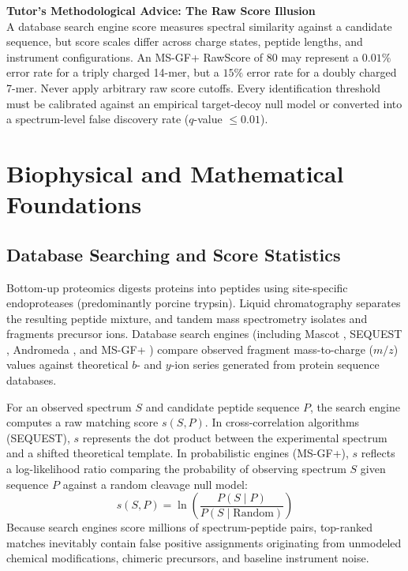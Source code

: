 \documentclass[11pt,twoside,openright]{book}
\begin{document}
\FloatBarrier

\begin{notebox}
\textbf{Tutor's Methodological Advice: The Raw Score Illusion}\\
A database search engine score measures spectral similarity against a candidate sequence, but score scales differ across charge states, peptide lengths, and instrument configurations. An MS-GF+ RawScore of 80 may represent a $0.01\%$ error rate for a triply charged 14-mer, but a $15\%$ error rate for a doubly charged 7-mer. Never apply arbitrary raw score cutoffs. Every identification threshold must be calibrated against an empirical target-decoy null model or converted into a spectrum-level false discovery rate ($q$-value $\le 0.01$).
\end{notebox}

\section{Biophysical and Mathematical Foundations}

\subsection{Database Searching and Score Statistics}
Bottom-up proteomics digests proteins into peptides using site-specific endoproteases (predominantly porcine trypsin). Liquid chromatography separates the resulting peptide mixture, and tandem mass spectrometry isolates and fragments precursor ions. Database search engines (including Mascot \cite{perkins1999probability}, SEQUEST \cite{eng1994approach}, Andromeda \cite{cox2011andromeda}, and MS-GF+ \cite{kim2014ms}) compare observed fragment mass-to-charge ($m/z$) values against theoretical $b$- and $y$-ion series generated from protein sequence databases.

For an observed spectrum $S$ and candidate peptide sequence $P$, the search engine computes a raw matching score $s(S, P)$. In cross-correlation algorithms (SEQUEST), $s$ represents the dot product between the experimental spectrum and a shifted theoretical template. In probabilistic engines (MS-GF+), $s$ reflects a log-likelihood ratio comparing the probability of observing spectrum $S$ given sequence $P$ against a random cleavage null model:
\begin{equation}
s(S, P) = \ln \left( \frac{P(S \mid P)}{P(S \mid \text{Random})} \right)
\label{eq:msgf_score}
\end{equation}
Because search engines score millions of spectrum-peptide pairs, top-ranked matches inevitably contain false positive assignments originating from unmodeled chemical modifications, chimeric precursors, and baseline instrument noise.
\end{document}
